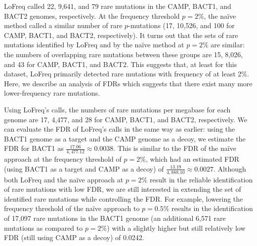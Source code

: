 LoFreq called 22, 9,641, and 79 rare mutations in the CAMP, BACT1, and BACT2 genomes, respectively. At the frequency threshold $p = 2\%$, the na\"ive method called a similar number of rare $p$-mutations (17, 10,526, and 100 for CAMP, BACT1, and BACT2, respectively). It turns out that the sets of rare mutations identified by LoFreq and by the na\"ive method at $p = 2\%$ are similar: the numbers of overlapping rare mutations between these groups are 15, 8,026, and 43 for CAMP, BACT1, and BACT2. This suggests that, at least for this dataset, LoFreq primarily detected rare mutations with frequency of at least 2\%. Here, we describe an analysis of FDRs which suggests that there exist many more lower-frequency rare mutations.

Using LoFreq's calls, the numbers of rare mutations per megabase for each genome are 17, 4,477, and 28 for CAMP, BACT1, and BACT2, respectively. We can evaluate the FDR of LoFreq's calls in the same way as earlier: using the BACT1 genome as a target and the CAMP genome as a decoy, we estimate the FDR for BACT1 as $\frac{17.06}{4,477.12} \approx 0.0038$. This is similar to the FDR of the na\"ive approach at the frequency threshold of $p = 2\%$, which had an estimated FDR (using BACT1 as a target and CAMP as a decoy) of $\frac{13.19}{4,888.10} \approx 0.0027$. Although both LoFreq and the na\"ive approach at $p = 2\%$ result in the reliable identification of rare mutations with low FDR, we are still interested in extending the set of identified rare mutations while controlling the FDR. For example, lowering the frequency threshold of the na\"ive approach to $p = 0.5\%$ results in the identification of 17,097 rare mutations in the BACT1 genome (an additional 6,571 rare mutations as compared to $p = 2\%$) with a slightly higher but still relatively low FDR (still using CAMP as a decoy) of 0.0242.\endinput